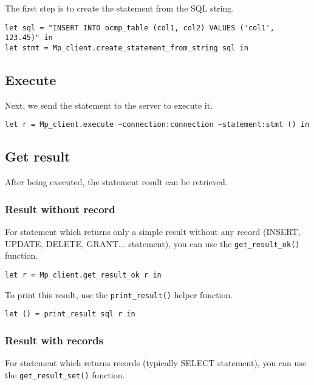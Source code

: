 \documentclass[a4paper, english, 11pt]{article}
\begin{document}
The first step is to create the statement from the SQL string.

\begin{lstlisting}
let sql = "INSERT INTO ocmp_table (col1, col2) VALUES ('col1', 123.45)" in
let stmt = Mp_client.create_statement_from_string sql in
\end{lstlisting}

\subsection{Execute}

Next, we send the statement to the server to execute it.

\begin{lstlisting}
let r = Mp_client.execute ~connection:connection ~statement:stmt () in
\end{lstlisting}

\subsection{Get result}

After being executed, the statement result can be retrieved.

\subsubsection{Result without record}

For statement which returns only a simple result without any record (INSERT, UPDATE, DELETE, GRANT... statement), you can use the \texttt{get\_result\_ok()} function.

\begin{lstlisting}
let r = Mp_client.get_result_ok r in
\end{lstlisting}

To print this result, use the \texttt{print\_result()} helper function.

\begin{lstlisting}
let () = print_result sql r in
\end{lstlisting}

\subsubsection{Result with records}

For statement which returns records (typically SELECT statement), you can use the \texttt{get\_result\_set()} function.
\end{document}
